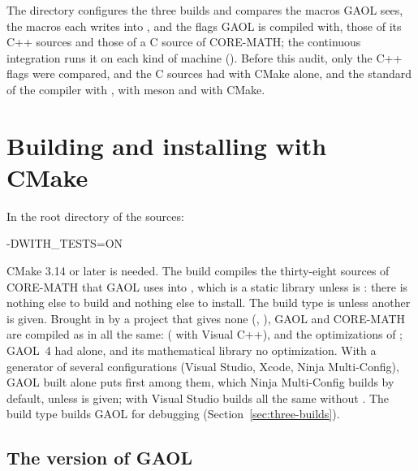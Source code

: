 \documentclass[12pt,a4paper,twoside,openright]{book}
\begin{document}
\medskip
The directory  configures the three builds and compares
the macros GAOL sees, the macros each writes into
, and the flags GAOL is compiled with, those
of its C++ sources and those of a C source of CORE-MATH; the continuous
integration runs it on each kind of machine (). Before this
audit, only the C++ flags were compared, and the C sources had
 with CMake alone, and the standard
of the compiler with ,  with meson and
 with CMake.\newinvfive

\section{Building and installing with CMake}\label{sec:cmake}
%

In the root directory of the sources:

\begin{cmdshell}
        -DWITH_TESTS=ON
\end{cmdshell}

\noindent
CMake 3.14 or later is needed. The build compiles the thirty-eight sources of
CORE-MATH that GAOL uses into , which is a static library unless
 is : there is nothing else to build and
nothing else to install. The build type is  unless another is
given. Brought in by a project that gives none (,
), GAOL and CORE-MATH are compiled as in  all
the same:  ( with Visual C++),  and the
optimizations of ; GAOL~4 had  alone, and its
mathematical library no optimization. With a generator of several
configurations (Visual Studio, Xcode, Ninja Multi-Config), GAOL built alone
puts  first among them, which Ninja Multi-Config builds by
default, unless  is given;  with Visual Studio builds  all the same without
.\newinvfive{} The  build type builds GAOL for
debugging (Section~\ref{sec:three-builds}).

\subsection{The version of GAOL}\label{sec:install-version}
%
\end{document}

